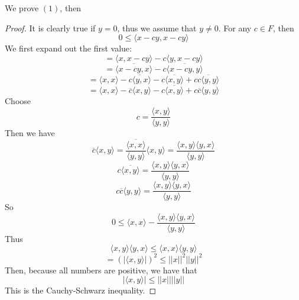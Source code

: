 \documentclass{article}
\newtheorem{one minute paper}[theorem]{One Minute Paper}
\begin{document}
We prove $(1)$, then 
\begin{proof}
    It is clearly true if $y = 0$, thus we assume that $y \neq 0$. For any $c \in F$, then 
    \begin{equation}
        0 \leq \langle x - cy, x - cy \rangle
    \end{equation}
    We first expand out the first value:
    \begin{equation}
        = \langle x, x-cy \rangle -c \langle y,x-cy \rangle 
    \end{equation}
    \begin{equation}
        = \overline{\langle x-cy, x \rangle} - c \overline{\langle x-cy, y \rangle}
    \end{equation}
    \begin{equation}
        = \langle x,x \rangle - \overline{c\langle y,x \rangle} - c\overline{\langle x,y \rangle} + c\overline{c\langle y,y \rangle}
    \end{equation}
    \begin{equation}
        = \langle x,x \rangle - \overline{c}\langle x,y \rangle - c \overline{\langle x,y \rangle} + c\overline{c}\langle y,y \rangle
    \end{equation}
    Choose
    \begin{equation}
        c = \frac{\langle x,y \rangle}{\langle y,y \rangle }
    \end{equation}
    Then we have 
    \begin{equation}
        \overline{c}\langle x,y \rangle = \frac{\overline{\langle x,x \rangle}}{\langle y,y \rangle}\langle x,y \rangle = \frac{\langle x,y \rangle \langle y,x \rangle}{\langle y,y \rangle}
    \end{equation}
    \begin{equation}
        c\overline{\langle x,y \rangle} =  \frac{\langle x,y \rangle \langle y,x \rangle}{\langle y,y \rangle}
    \end{equation}
    \begin{equation}
        c\overline{c} \langle y,y \rangle = \frac{\langle x,y \rangle \langle y,x \rangle}{\langle y,y \rangle}
    \end{equation}
    So 
    \begin{equation}
        0 \leq \langle x,x \rangle - \frac{\langle x,y \rangle \langle y,x \rangle}{\langle y,y \rangle}
    \end{equation}
    Thus 
    \begin{equation}
        \langle x,y \rangle \langle y,x \rangle \leq \langle x,x \rangle \langle y,y \rangle 
    \end{equation}
    \begin{equation}
        = (|\langle x,y \rangle|)^2 \leq ||x||^2||y||^2
    \end{equation}
    Then, because all numbers are positive, we have that  
    \begin{equation}
        |\langle x,y \rangle| \leq ||x|| ||y||
    \end{equation}
    This is the Cauchy-Schwarz inequality. 
\end{proof}
\end{document}
